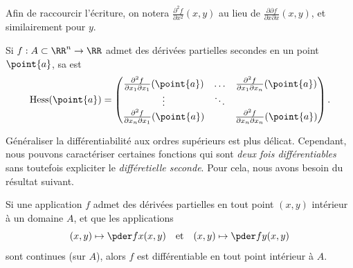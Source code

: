 \begin{frame}
  \begin{remark*}
    Afin de raccourcir l'écriture,\pause{} on notera \(\frac{\partial^{2} f}{\partial x^{2}}(x,y)\) au lieu de \(\frac{\partial\partial f}{\partial x\partial x}(x,y)\),\pause{} et similairement pour \(y\).
  \end{remark*}\pause{}
  \begin{definition}Si \(f : A \subset \RR^{n} \to \RR\) admet des dérivées partielles secondes en un point \(\point{a}\),\pause{} sa \pause{} est
    \begin{equation*}
      \operatorname{Hess} ({\point{a}}) = \begin{pmatrix}
        \frac{\partial^{2} f}{\partial x_1\partial x_1}(\point{a}) & \ldots & \frac{\partial^{2} f}{\partial x_1\partial x_n}(\point{a}) \\
        \vdots                                                     & \ddots &                                                            \\
        \frac{\partial^{2} f}{\partial x_n\partial x_1}(\point{a}) &        & \frac{\partial^{2} f}{\partial x_n\partial x_n}(\point{a}) \\
      \end{pmatrix}.
    \end{equation*} 
  \end{definition}
  \end{frame}
\begin{frame}
  \begin{remark*}
    Généraliser la différentiabilité aux ordres supérieurs est plus délicat.\pause{} Cependant, nous pouvons caractériser certaines fonctions qui sont \emph{deux fois différentiables}\pause{} sans toutefois expliciter le \emph{différetielle seconde}.\pause{} Pour cela, nous avons besoin du résultat suivant.
  \end{remark*}\pause{}
  \begin{proposition}
    Si une application \(f\) admet des dérivées partielles en tout point \((x,y)\) intérieur à un domaine \(A\),\pause{} et que les applications
    \begin{equation*}
      (x,y)\mapsto \pder f x (x,y) \quad\text{et}\quad     (x,y)\mapsto \pder f y (x,y)
    \end{equation*}\pause{}
    sont continues (sur \(A\)),\pause{} alors \(f\) est différentiable en tout point intérieur à \(A\).
  \end{proposition}
\end{frame}

